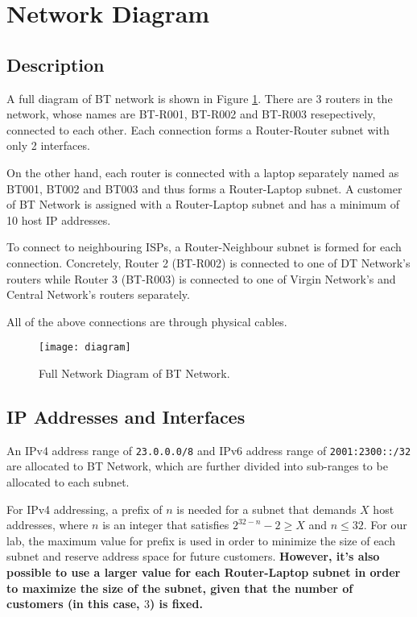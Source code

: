 \section{Network Diagram}
\label{sec:diagram}

\subsection{Description}

A full diagram of BT network is shown in Figure \ref{fig:diagram}.
There are 3 routers in the network, whose names are BT-R001, BT-R002 and BT-R003 resepectively, connected to each other. 
Each connection forms a Router-Router subnet with only 2 interfaces.

On the other hand, each router is connected with a laptop separately named as BT001, BT002 and BT003 and thus forms a Router-Laptop subnet.
A customer of BT Network is assigned with a Router-Laptop subnet and has a minimum of 10 host IP addresses.

To connect to neighbouring ISPs, a Router-Neighbour subnet is formed for each connection. Concretely, Router 2 (BT-R002) is connected to one of DT Network's routers while Router 3 (BT-R003) is connected to one of Virgin Network's and Central Network's routers separately.

All of the above connections are through physical cables.

\begin{landscape}
\begin{figure}[t!]
    \centering
    \texttt{[image: diagram]}
    \caption{Full Network Diagram of BT Network.}
    \label{fig:diagram}
\end{figure}
\end{landscape}




\subsection{IP Addresses and Interfaces}

An IPv4 address range of \texttt{23.0.0.0/8} and IPv6 address range of \texttt{2001:2300::/32} are allocated to BT Network, which are further divided into sub-ranges to be allocated to each subnet.

For IPv4 addressing, a prefix of $n$ is needed for a subnet that demands $X$ host addresses, where $n$ is an integer that satisfies $2^{32-n} - 2 \geq X$ and $n \leq 32$. For our lab, the maximum value for prefix is used in order to minimize the size of each subnet and reserve address space for future customers. 
\textbf{However, it's also possible to use a larger value for each Router-Laptop subnet in order to maximize the size of the subnet, given that the number of customers (in this case, $3$) is fixed.}

